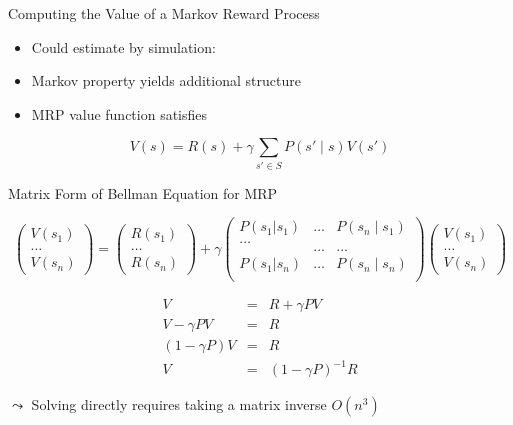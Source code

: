 \documentclass[aspectratio=169]{../latex_main/tntbeamer}  %
\begin{document}
\begin{frame}[c]{Computing the Value of a Markov Reward Process}
	
	\begin{itemize}
		\item Could estimate by simulation:
		\item Markov property yields additional structure
		\item MRP value function satisfies
	\end{itemize}

$$V(s) = R(s) + \gamma \sum_{s' \in S} P(s'\mid s) V(s')$$
	
\end{frame}
\begin{frame}[c]{Matrix Form of Bellman Equation for MRP}

$$\begin{pmatrix}
V(s_1)\\
\ldots\\
V(s_n)
\end{pmatrix} =
\begin{pmatrix}
R(s_1)\\
\ldots\\
R(s_n)
\end{pmatrix} 
+ \gamma 
\begin{pmatrix}
P(s_1|s_1)  & \ldots &  P(s_n \mid s_1)\\
\ldots\\ 	& \ldots & \ldots \\
P(s_1| s_n) & \ldots & P(s_n \mid s_n)\\
\end{pmatrix} 
\begin{pmatrix}
V(s_1)\\
\ldots\\
V(s_n)
\end{pmatrix} 
$$

\pause

\begin{eqnarray}
V &=& R + \gamma P V\\
V  - \gamma P V &=& R\\
(1- \gamma P) V  &=& R\\
V &=& (1- \gamma P)^{-1} R
\end{eqnarray}

\pause
$\leadsto$ Solving directly requires taking a matrix inverse $O(n^3)$

\end{frame}
\end{document}
